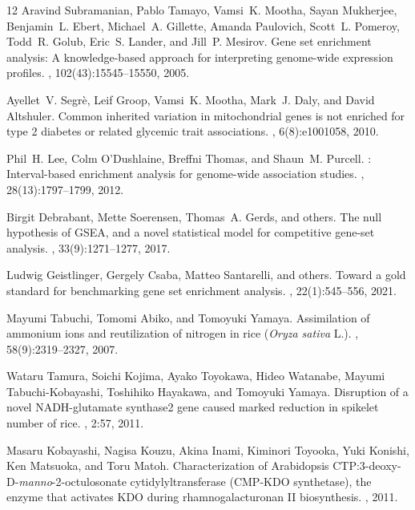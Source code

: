 \documentclass[unnumsec,webpdf,contemporary,large]{oup-authoring-template}%
\theoremstyle{thmstyleone}%
\theoremstyle{thmstyletwo}%
\theoremstyle{thmstylethree}%
\begin{document}
\begin{thebibliography}{12}
Aravind Subramanian, Pablo Tamayo, Vamsi~K. Mootha, Sayan Mukherjee,
Benjamin~L. Ebert, Michael~A. Gillette, Amanda Paulovich, Scott~L. Pomeroy,
Todd~R. Golub, Eric~S. Lander, and Jill~P. Mesirov.
\newblock Gene set enrichment analysis: A knowledge-based approach for
interpreting genome-wide expression profiles.
,
102(43):15545--15550, 2005.

Ayellet~V. Segr{\`e}, Leif Groop, Vamsi~K. Mootha, Mark~J. Daly, and
David Altshuler.
\newblock Common inherited variation in mitochondrial genes is not enriched for
type 2 diabetes or related glycemic trait associations.
, 6(8):e1001058, 2010.

Phil~H. Lee, Colm O'Dushlaine, Breffni Thomas, and Shaun~M. Purcell.
: Interval-based enrichment analysis for genome-wide
association studies.
, 28(13):1797--1799, 2012.

Birgit Debrabant, Mette Soerensen, Thomas~A. Gerds, and others.
\newblock The null hypothesis of {GSEA}, and a novel statistical model for
competitive gene-set analysis.
, 33(9):1271--1277, 2017.

Ludwig Geistlinger, Gergely Csaba, Matteo Santarelli, and others.
\newblock Toward a gold standard for benchmarking gene set enrichment analysis.
, 22(1):545--556, 2021.

Mayumi Tabuchi, Tomomi Abiko, and Tomoyuki Yamaya.
\newblock Assimilation of ammonium ions and reutilization of nitrogen in rice (\textit{Oryza sativa} L.).
, 58(9):2319--2327, 2007.

Wataru Tamura, Soichi Kojima, Ayako Toyokawa, Hideo Watanabe, Mayumi Tabuchi-Kobayashi, Toshihiko Hayakawa, and Tomoyuki Yamaya.
\newblock Disruption of a novel NADH-glutamate synthase2 gene caused marked reduction in spikelet number of rice.
, 2:57, 2011.

Masaru Kobayashi, Nagisa Kouzu, Akina Inami, Kiminori Toyooka, Yuki Konishi, Ken Matsuoka, and Toru Matoh.
\newblock Characterization of Arabidopsis CTP:3-deoxy-D-\textit{manno}-2-octulosonate cytidylyltransferase (CMP-KDO synthetase), the enzyme that activates KDO during rhamnogalacturonan II biosynthesis.
, 2011.


\end{thebibliography}
\end{document}

